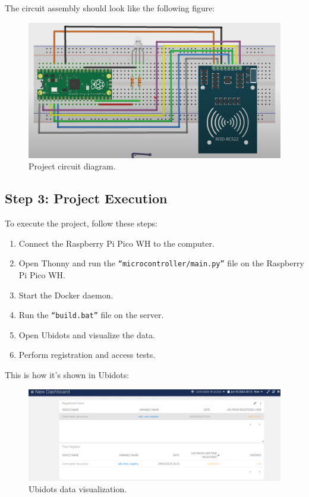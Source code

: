 \documentclass{article}
\begin{document}
The circuit assembly should look like the following figure:
\begin{figure}[H]
	\centering
	\includegraphics[width=1\linewidth]{../images/esquema_de_conexionado.png}
	\caption{\label{fig:circuito}Project circuit diagram.}
\end{figure}


\subsection{Step 3: Project Execution}
To execute the project, follow these steps:
\begin{enumerate}
	\item Connect the Raspberry Pi Pico WH to the computer.
	\item Open Thonny and run the \texttt{``microcontroller/main.py''} file on the Raspberry Pi Pico WH.
	\item Start the Docker daemon.
	\item Run the \texttt{``build.bat''} file on the server.
	\item Open Ubidots and visualize the data.
	\item Perform registration and access tests.
\end{enumerate}
This is how it's shown in Ubidots:
\begin{figure}[H]
    \centering
    \includegraphics[width=1\linewidth]{../images/ubidots_visualizacion.png}
    \caption{\label{fig:ubidots_visualizacion}Ubidots data visualization.}
\end{figure}
\end{document}
